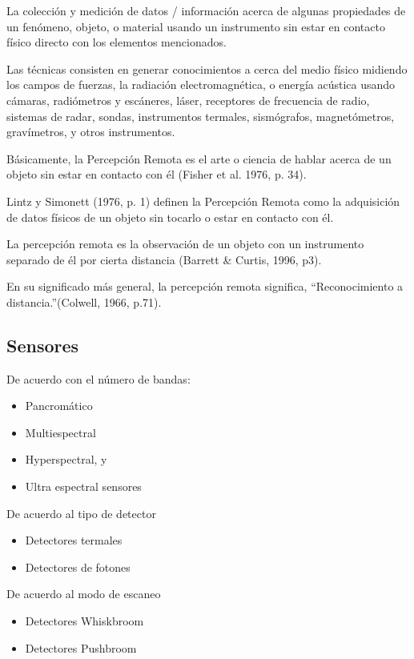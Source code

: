 \begin{definition}
  La colección y medición de datos / información acerca de algunas propiedades de un fenómeno, objeto, o material usando un instrumento sin estar en contacto físico directo con los elementos mencionados.
\end{definition}

Las técnicas consisten en generar conocimientos a cerca del medio físico midiendo los campos de fuerzas, la radiación electromagnética, o energía acústica usando cámaras, radiómetros y escáneres, láser, receptores de frecuencia de radio, sistemas de radar, sondas, instrumentos termales, sismógrafos, magnetómetros, gravímetros, y otros instrumentos. 

Básicamente, la Percepción Remota es el arte o ciencia de hablar acerca de un objeto sin estar en contacto con él (Fisher et al. 1976, p. 34). 

Lintz y Simonett (1976, p. 1) definen la Percepción Remota como la adquisición de datos físicos de un objeto sin tocarlo o estar en contacto con él.

La percepción remota es la observación de un objeto con un instrumento  separado de él por cierta distancia (Barrett \& Curtis, 1996, p3).

En su significado más general, la percepción remota significa, “Reconocimiento a distancia.”(Colwell, 1966, p.71).

\subsection{Sensores}
De acuerdo con el número de bandas:
\begin{itemize}
  \item Pancromático
  \item Multiespectral 
  \item Hyperspectral, y
  \item Ultra espectral sensores
\end{itemize}
De acuerdo al tipo de detector
\begin{itemize}
  \item Detectores termales
  \item Detectores de fotones
\end{itemize}
De acuerdo al modo de escaneo
\begin{itemize}
  \item Detectores Whiskbroom   
  \item Detectores Pushbroom
\end{itemize}

